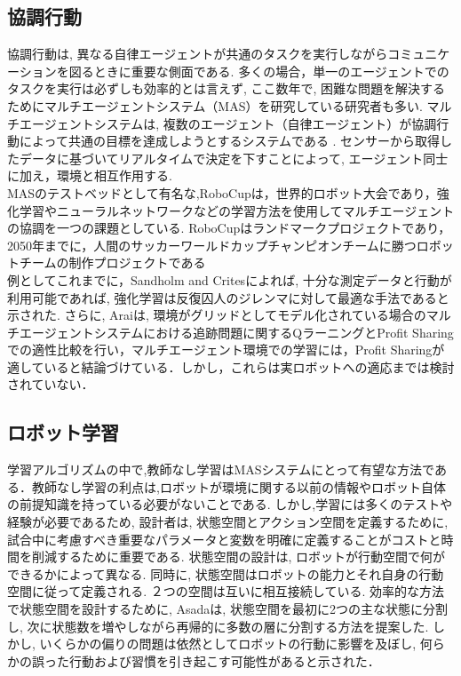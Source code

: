 \subsection{協調行動}
協調行動は, 異なる自律エージェントが共通のタスクを実行しながらコミュニケーションを図るときに重要な側面である. 多くの場合，単一のエージェントでのタスクを実行は必ずしも効率的とは言えず, ここ数年で, 困難な問題を解決するためにマルチエージェントシステム（MAS）を研究している研究者も多い. マルチエージェントシステムは, 複数のエージェント（自律エージェント）が協調行動によって共通の目標を達成しようとするシステムである .  センサーから取得したデータに基づいてリアルタイムで決定を下すことによって, エージェント同士に加え，環境と相互作用する. \\
MASのテストベッドとして有名な,RoboCupは，世界的ロボット大会であり，強化学習やニューラルネットワークなどの学習方法を使用してマルチエージェントの協調を一つの課題としている.  RoboCup\cite{RoboCup}はランドマークプロジェクトであり，2050年までに，人間のサッカーワールドカップチャンピオンチームに勝つロボットチームの制作プロジェクトである\\
例としてこれまでに，Sandholm and Crites\cite{Sandholm1995OnMQ}によれば, 十分な測定データと行動が利用可能であれば, 強化学習は反復囚人のジレンマに対して最適な手法であると示された. さらに, Arai\cite{Arai}は, 環境がグリッドとしてモデル化されている場合のマルチエージェントシステムにおける追跡問題に関するQラーニングとProfit Sharing\cite{Grefenstette}での適性比較を行い，マルチエージェント環境での学習には，Profit Sharingが適していると結論づけている．しかし，これらは実ロボットへの適応までは検討されていない．

\subsection{ロボット学習}
学習アルゴリズムの中で,教師なし学習はMASシステムにとって有望な方法である．教師なし学習の利点は,ロボットが環境に関する以前の情報やロボット自体の前提知識を持っている必要がないことである. しかし,学習には多くのテストや経験が必要であるため, 設計者は, 状態空間とアクション空間を定義するために, 試合中に考慮すべき重要なパラメータと変数を明確に定義することがコストと時間を削減するために重要である. 状態空間の設計は, ロボットが行動空間で何ができるかによって異なる. 同時に, 状態空間はロボットの能力とそれ自身の行動空間に従って定義される. ２つの空間は互いに相互接続している. 効率的な方法で状態空間を設計するために, Asada\cite{Asada2000}は, 状態空間を最初に2つの主な状態に分割し, 次に状態数を増やしながら再帰的に多数の層に分割する方法を提案した. しかし, いくらかの偏りの問題は依然としてロボットの行動に影響を及ぼし, 何らかの誤った行動および習慣を引き起こす可能性があると示された．

